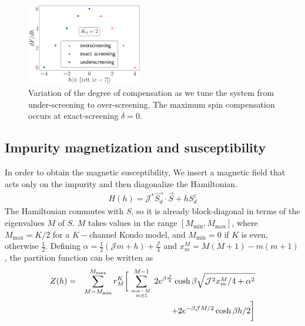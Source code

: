 \documentclass[reprint,prb,superscriptaddress]{revtex4-2}
\begin{document}
\begin{figure}[htpb]
	\centering
	\includegraphics[width=0.45\textwidth]{plt/deg_of_comp.pdf}
	\caption{Variation of the degree of compensation as we tune the system from under-screening to over-screening. The maximum spin compensation occurs at exact-screening \(\delta=0\).}
\end{figure}

\subsection{Impurity magnetization and susceptibility}
\label{sec:imp_suscept}
In order to obtain the magnetic susceptibility, We insert a magnetic field that acts only on the impurity and then diagonalize the Hamiltonian.
\begin{align}
	\label{stargraph_field_hamiltonian}
	H(h) = {\mathcal{J}^*} \vec{S_d}\cdot\vec{S} + h S_d^z
\end{align}
The Hamiltonian commutes with \(S\), so it is already block-diagonal in terms of the eigenvalues \(M\) of \(S\). \(M\) takes values in the range \(\left[M_\text{min}, M_\text{max}\right]\), where \(M_\text{max} = K/2\) for a \(K-\)channel Kondo model, and \(M_\text{min} = 0\)  if \(K\) is even, otherwise \(\frac{1}{2}\). Defining \(\alpha = \frac{1}{2}\left({\mathcal{J}}m + h\right) + \frac{{\mathcal{J}}}{4}\) and \(x^M_m = M(M+1) - m(m+1)\), the partition function can be written as
\begin{eqnarray}
Z(h) &=&\sum_{M=M_\text{min}}^{M_\text{max}}r^K_M\bigg[\sum_{m=-M, \atop{m\in \mathbb{Z}}}^{M-1}2e^{\beta \frac{{\mathcal{J}}}{4}}\cosh \beta\sqrt{{\mathcal{J}}^2x^M_m/4 + \alpha^2} \nonumber\\
&&\hspace{2cm}+ 2e^{-\beta {\mathcal{J}}M/2}\cosh \beta h/2\bigg]
\end{eqnarray}
\end{document}
